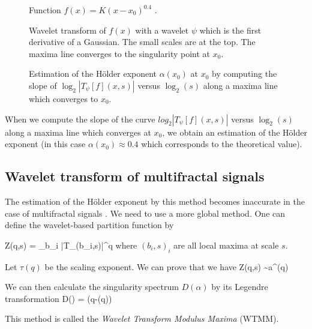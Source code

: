 \begin{figure}[htb]
\centerline{
\vbox{
}}
\caption{Function $f(x)=K(x-x_0)^{0.4}$ \cite{frac:arneodo90}.}
\label{fig_2}
\end{figure}

\begin{figure}[htb]
\centerline{
\vbox{
}}
\caption{
Wavelet transform of $f(x)$ with a wavelet $\psi$ which is the first 
derivative of
a Gaussian. The small scales are at the top. The maxima line converges to the
singularity point at $x_0$.}
\label{fig_3}
\end{figure}

\begin{figure}[htb]
\centerline{
\vbox{
}}
\caption{
Estimation of the H\"older exponent $\alpha(x_0)$ at 
$x_0$ by computing the slope of $\log_2 {|T_\psi[f](x,s)|}$ versus
$\log_2(s)$ along a maxima line which converges to $x_0$.}
\label{fig_4}
\end{figure}

When we compute the slope of the curve $log_2 {|T_\psi[f](x,s)|}$
versus $\log_2(s)$ along a maxima line which converges at $x_0$, 
we obtain an estimation of the H\"older exponent (in this case
$\alpha(x_0) \approx 0.4$
which corresponds to the theoretical value).


\subsection{Wavelet transform of multifractal signals }

The estimation of the H\"older exponent by this method 
 becomes inaccurate
in the case of multifractal signals \cite{frac:arneodo90}. 
We need to use a more global
method. One can define the wavelet-based partition function by

\be
Z(q,s) = \sum_{b_i} |T_\psi[\mu](b_i,s)|^q
\ee
where ${(b_i,s)}_i$ are all local maxima at scale $s$.

Let $\tau(q)$ be the scaling exponent. We can prove that we have
\be
Z(q,s) \sim a^{\tau(q)}
\ee

We can then calculate the singularity spectrum $D(\alpha)$ by its Legendre
transformation 
\be
D(\alpha) =  (q\alpha-\tau(q))
\ee
 
This method is called the {\em Wavelet Transform Modulus Maxima} (WTMM).
 

